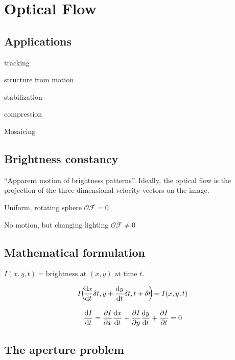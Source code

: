 \chapter{Optical Flow}
\section{Applications}
\begin{inparaenum}[\itshape(1)]
	\item tracking
	\item structure from motion
	\item stabilization
	\item compression
	\item Mosaicing
\end{inparaenum}
\section{Brightness constancy}
\begin{compactdesc}
	\item[\lp{Definition of Optical Flow}] ``Apparent motion of brightness patterns''. Ideally, the optical flow is the projection of the three-dimensional velocity vectors on the image.
	\item[\lp{Caution required}]
		\begin{inparaenum}[\itshape (1)]
			\item Uniform, rotating sphere $\mathcal{OF}=0$
			\item No motion, but changing lighting $\mathcal{OF}\neq0$
		\end{inparaenum}
		\section{Mathematical formulation}
		$I(x,y,t)=\text{brightness at }(x,y)\text{ at time }t$.
	\item[\lp{Brightness constancy assumption:}]
		\begin{gather*}
			I\!\left(\!\! \frac{\mathrm d x}{\mathrm d t}\delta t,y+\frac{\mathrm d y}{\mathrm d t} \delta t,t+\delta t \!\!\right)\!=I(x,y,t)
		\end{gather*}
	\item[\lp{Optical flow constraint equation:}]
		\begin{gather*}
			\frac{\mathrm d I}{\mathrm d t}=\frac{\partial I}{\partial x}\frac{\mathrm d x}{\mathrm d t}+\frac{\partial I}{\partial y}\frac{\mathrm d y}{\mathrm d t}+\frac{\partial I}{\partial t}=0
		\end{gather*}
		\section{The aperture problem}
\end{compactdesc}
